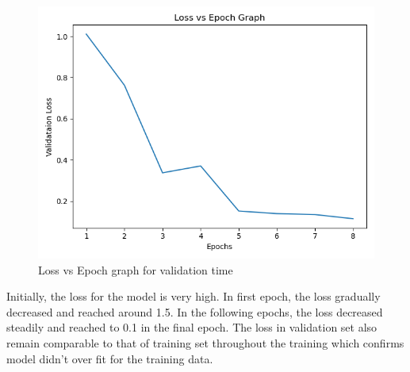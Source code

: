 \documentclass{ioereport}
\begin{document}
     \begin{figure}[H]
        \includegraphics[scale=.8]{images/Validataion Loss.png}
        \caption{Loss vs Epoch graph for validation time}
        \label{fig:lvsepochv}
    \end{figure}


        
        Initially, the loss for the model is very high. In first epoch, the loss gradually decreased
and reached around 1.5. In the following epochs, the loss decreased steadily and
reached to 0.1 in the final epoch. The loss in validation set also remain comparable to
that of training set throughout the training which confirms model didn’t over fit for the
training data.
\end{document}
